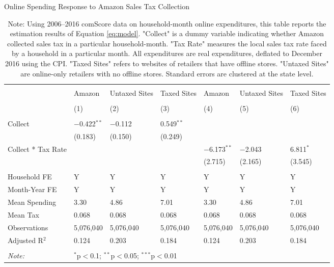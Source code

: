
\begin{table}[!htbp] \centering
  \caption{Online Spending Response to Amazon Sales Tax Collection}
  \label{tab:spendingDiD}
\begin{tabularx}{\textwidth}{lXXXXXX}
\\[-1.8ex]\hline
\hline \\[-1.8ex]
 & Amazon & Untaxed Sites & Taxed Sites & Amazon & Untaxed Sites & Taxed Sites \\
\\[-1.8ex] & (1) & (2) & (3) & (4) & (5) & (6)\\
\hline \\[-1.8ex]
 Collect & $-$0.422$^{**}$ & $-$0.112 & 0.549$^{**}$ &  &  &  \\
  & (0.183) & (0.150) & (0.249) &  &  &  \\
  Collect * Tax Rate &  &  &  & $-$6.173$^{**}$ & $-$2.043 & 6.811$^{*}$ \\
  &  &  &  & (2.715) & (2.165) & (3.545) \\
 \hline \\[-1.8ex]
Household FE & Y & Y & Y & Y & Y & Y \\
Month-Year FE & Y & Y & Y & Y & Y & Y \\
Mean Spending & 3.30 & 4.86 & 7.01 & 3.30 & 4.86 & 7.01 \\
Mean Tax & 0.068 & 0.068 & 0.068 & 0.068 & 0.068 & 0.068 \\
Observations & 5,076,040 & 5,076,040 & 5,076,040 & 5,076,040 & 5,076,040 & 5,076,040 \\
Adjusted R$^{2}$ & 0.124 & 0.203 & 0.184 & 0.124 & 0.203 & 0.184 \\
\hline
\hline \\[-1.8ex]
\textit{Note:}  & \multicolumn{6}{l}{$^{*}$p$<$0.1; $^{**}$p$<$0.05; $^{***}$p$<$0.01} \\
\end{tabularx}
\caption*{Note: Using 2006--2016 comScore data on household-month online expenditures, this table reports the estimation results of Equation \ref{eq:model}. "Collect" is a dummy variable indicating whether Amazon collected sales tax in a particular household-month. "Tax Rate" measures the local sales tax rate faced by a household in a particular month. All expenditures are real expenditures, deflated to December 2016 using the CPI. "Taxed Sites" refers to websites of retailers that have offline stores. "Untaxed Sites" are online-only retailers with no offline stores. Standard errors are clustered at the state level.}
\end{table}
